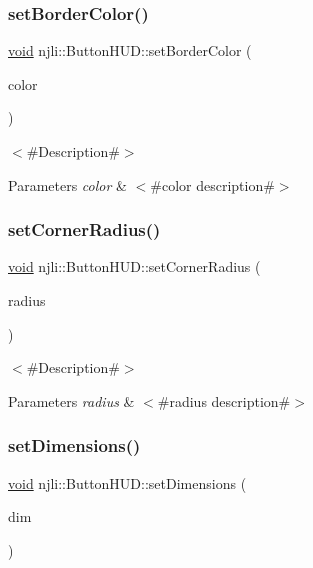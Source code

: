 \subsubsection{\texorpdfstring{set\+Border\+Color()}{setBorderColor()}}
{\footnotesize\ttfamily \mbox{\hyperlink{_thread_8h_af1e856da2e658414cb2456cb6f7ebc66}{void}} njli\+::\+Button\+H\+U\+D\+::set\+Border\+Color (\begin{DoxyParamCaption}\item[{const bt\+Vector4 \&}]{color }\end{DoxyParamCaption})}

$<$\#\+Description\#$>$


\begin{DoxyParams}{Parameters}
{\em color} & $<$\#color description\#$>$ \\
\hline
\end{DoxyParams}
\mbox{\label{classnjli_1_1_button_h_u_d_a38b826893d35569f5f4bad03282523da}} 
\subsubsection{\texorpdfstring{set\+Corner\+Radius()}{setCornerRadius()}}
{\footnotesize\ttfamily \mbox{\hyperlink{_thread_8h_af1e856da2e658414cb2456cb6f7ebc66}{void}} njli\+::\+Button\+H\+U\+D\+::set\+Corner\+Radius (\begin{DoxyParamCaption}\item[{\mbox{\hyperlink{_util_8h_a5f6906312a689f27d70e9d086649d3fd}{f32}}}]{radius }\end{DoxyParamCaption})}

$<$\#\+Description\#$>$


\begin{DoxyParams}{Parameters}
{\em radius} & $<$\#radius description\#$>$ \\
\hline
\end{DoxyParams}
\mbox{\label{classnjli_1_1_button_h_u_d_a94ef2e932df76cb8b390420dce0ecfe2}} 
\subsubsection{\texorpdfstring{set\+Dimensions()}{setDimensions()}}
{\footnotesize\ttfamily \mbox{\hyperlink{_thread_8h_af1e856da2e658414cb2456cb6f7ebc66}{void}} njli\+::\+Button\+H\+U\+D\+::set\+Dimensions (\begin{DoxyParamCaption}\item[{const bt\+Vector2 \&}]{dim }\end{DoxyParamCaption})}

